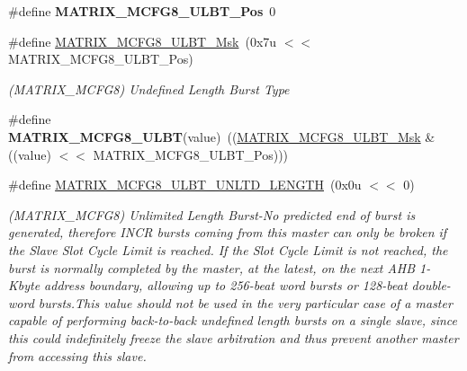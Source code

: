 \begin{DoxyCompactItemize}
\mbox{\label{group__SAMS70__MATRIX_ga0f966d5704988e6d44c0fc580a1bae2b}} 
\#define {\bfseries M\+A\+T\+R\+I\+X\+\_\+\+M\+C\+F\+G8\+\_\+\+U\+L\+B\+T\+\_\+\+Pos}~0
\item 
\mbox{\label{group__SAMS70__MATRIX_ga7a1875a3f46b451286eef4954b1ab397}} 
\#define \mbox{\hyperlink{group__SAMS70__MATRIX_ga7a1875a3f46b451286eef4954b1ab397}{M\+A\+T\+R\+I\+X\+\_\+\+M\+C\+F\+G8\+\_\+\+U\+L\+B\+T\+\_\+\+Msk}}~(0x7u $<$$<$ M\+A\+T\+R\+I\+X\+\_\+\+M\+C\+F\+G8\+\_\+\+U\+L\+B\+T\+\_\+\+Pos)
\begin{DoxyCompactList}\small\item\em (M\+A\+T\+R\+I\+X\+\_\+\+M\+C\+F\+G8) Undefined Length Burst Type \end{DoxyCompactList}\item 
\mbox{\label{group__SAMS70__MATRIX_ga8fa99b17e0bb94c4e80eddac9ac969b8}} 
\#define {\bfseries M\+A\+T\+R\+I\+X\+\_\+\+M\+C\+F\+G8\+\_\+\+U\+L\+BT}(value)~((\mbox{\hyperlink{group__SAMS70__MATRIX_ga7a1875a3f46b451286eef4954b1ab397}{M\+A\+T\+R\+I\+X\+\_\+\+M\+C\+F\+G8\+\_\+\+U\+L\+B\+T\+\_\+\+Msk}} \& ((value) $<$$<$ M\+A\+T\+R\+I\+X\+\_\+\+M\+C\+F\+G8\+\_\+\+U\+L\+B\+T\+\_\+\+Pos)))
\item 
\mbox{\label{group__SAMS70__MATRIX_gacd65d6bb1b1580665f6b0161d10d986f}} 
\#define \mbox{\hyperlink{group__SAMS70__MATRIX_gacd65d6bb1b1580665f6b0161d10d986f}{M\+A\+T\+R\+I\+X\+\_\+\+M\+C\+F\+G8\+\_\+\+U\+L\+B\+T\+\_\+\+U\+N\+L\+T\+D\+\_\+\+L\+E\+N\+G\+TH}}~(0x0u $<$$<$ 0)
\begin{DoxyCompactList}\small\item\em (M\+A\+T\+R\+I\+X\+\_\+\+M\+C\+F\+G8) Unlimited Length Burst-\/\+No predicted end of burst is generated, therefore I\+N\+CR bursts coming from this master can only be broken if the Slave Slot Cycle Limit is reached. If the Slot Cycle Limit is not reached, the burst is normally completed by the master, at the latest, on the next A\+HB 1-\/Kbyte address boundary, allowing up to 256-\/beat word bursts or 128-\/beat double-\/word bursts.\+This value should not be used in the very particular case of a master capable of performing back-\/to-\/back undefined length bursts on a single slave, since this could indefinitely freeze the slave arbitration and thus prevent another master from accessing this slave. \end{DoxyCompactList}\item 
$$
\end{DoxyCompactItemize}
